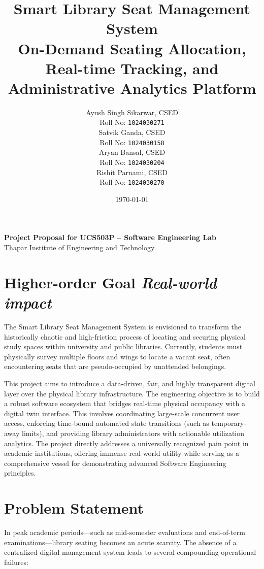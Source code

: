 \documentclass[11pt,a4paper]{article}
\title{\textbf{Smart Library Seat Management System}\\
\large On-Demand Seating Allocation, Real-time Tracking, and Administrative Analytics Platform}
\author{
Ayush Singh Sikarwar, CSED\\
Roll No: \texttt{1024030271}\\[4pt]
Satvik Ganda, CSED\\
Roll No: \texttt{1024030158}\\[4pt]
Aryan Bansal, CSED\\
Roll No: \texttt{1024030204}\\[4pt]
Rishit Parnami, CSED\\
Roll No: \texttt{1024030270}
}
\date{\today}
\newcommand{\BvrHint}[1]{{\normalfont\normalsize\itshape\hfill #1}}
\begin{document}
\maketitle

\begin{center}
\textbf{\color{LibraryAccent} Project Proposal for UCS503P -- Software Engineering Lab}\\
Thapar Institute of Engineering and Technology
\end{center}

\section{Higher-order Goal \BvrHint{Real-world impact}}
The Smart Library Seat Management System is envisioned to transform the historically chaotic and high-friction process of locating and securing physical study spaces within university and public libraries. Currently, students must physically survey multiple floors and wings to locate a vacant seat, often encountering seats that are pseudo-occupied by unattended belongings. 

This project aims to introduce a data-driven, fair, and highly transparent digital layer over the physical library infrastructure. The engineering objective is to build a robust software ecosystem that bridges real-time physical occupancy with a digital twin interface. This involves coordinating large-scale concurrent user access, enforcing time-bound automated state transitions (such as temporary-away limits), and providing library administrators with actionable utilization analytics. The project directly addresses a universally recognized pain point in academic institutions, offering immense real-world utility while serving as a comprehensive vessel for demonstrating advanced Software Engineering principles.

\section{Problem Statement}
In peak academic periods—such as mid-semester evaluations and end-of-term examinations—library seating becomes an acute scarcity. The absence of a centralized digital management system leads to several compounding operational failures:
\end{document}

